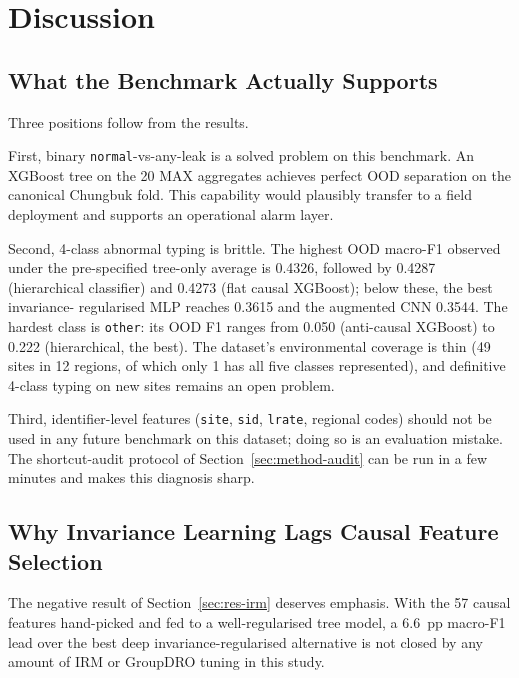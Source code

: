 \documentclass[sensors,article,submit,pdftex,oneauthor]{Definitions/mdpi}
\begin{document}
\section{Discussion}\label{sec:discussion}

\subsection{What the Benchmark Actually Supports}

Three positions follow from the results.

First, binary \texttt{normal}-vs-any-leak is a solved
problem on this benchmark. An XGBoost tree on the 20 MAX
aggregates achieves perfect OOD separation on the canonical
Chungbuk fold. This capability would plausibly transfer to
a field deployment and supports an operational alarm layer.

Second, 4-class abnormal typing is brittle. The highest OOD
macro-F1 observed under the pre-specified tree-only average is 0.4326,
followed by 0.4287 (hierarchical classifier) and 0.4273
(flat causal XGBoost); below these, the best invariance-
regularised MLP reaches 0.3615 and the augmented CNN 0.3544. The hardest class is
\texttt{other}: its OOD F1 ranges from 0.050 (anti-causal
XGBoost) to 0.222 (hierarchical, the best). The dataset's
environmental coverage is thin (49 sites in 12 regions, of
which only 1 has all five classes represented), and
definitive 4-class typing on new sites remains an open
problem.

Third, identifier-level features (\texttt{site},
\texttt{sid}, \texttt{lrate}, regional codes) should not be
used in any future benchmark on this dataset; doing so is
an evaluation mistake. The shortcut-audit protocol of
Section~\ref{sec:method-audit} can be run in a few minutes
and makes this diagnosis sharp.

\subsection{Why Invariance Learning Lags Causal Feature Selection}

The negative result of Section~\ref{sec:res-irm} deserves
emphasis. With the 57 causal features hand-picked and fed
to a well-regularised tree model, a 6.6~pp macro-F1 lead
over the best deep invariance-regularised alternative is
not closed by any amount of IRM or GroupDRO tuning in this
study.
\end{document}
